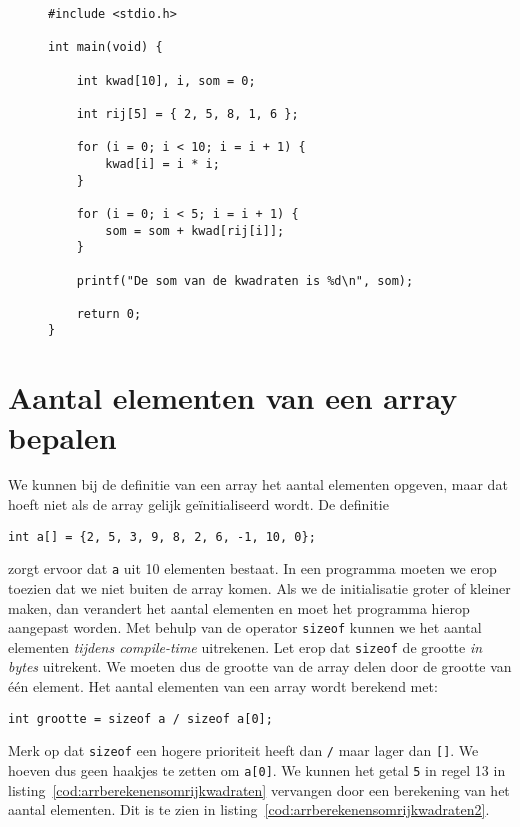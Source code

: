 \begin{figure}[!ht]
\begin{lstlisting}[caption=Afdrukken van de som van twee  kwadraten.,label=cod:arrberekenensomrijkwadraten]
#include <stdio.h>

int main(void) {
 
    int kwad[10], i, som = 0;

    int rij[5] = { 2, 5, 8, 1, 6 };

    for (i = 0; i < 10; i = i + 1) {
        kwad[i] = i * i;
    }

    for (i = 0; i < 5; i = i + 1) {
        som = som + kwad[rij[i]];
    }

    printf("De som van de kwadraten is %d\n", som);

    return 0;
}
\end{lstlisting}
\end{figure}


\section{Aantal elementen van een array bepalen}
We kunnen bij de definitie van een array het aantal elementen opgeven, maar dat hoeft niet als de array gelijk geïnitialiseerd wordt. De definitie

\begin{lstlisting}[style=lstoneline]
int a[] = {2, 5, 3, 9, 8, 2, 6, -1, 10, 0};
\end{lstlisting}

zorgt ervoor dat \texttt{a} uit 10 elementen bestaat. In een programma moeten we erop toezien dat we niet buiten de array komen. Als we de initialisatie groter of kleiner maken, dan verandert het aantal elementen en moet het programma hierop aangepast worden. Met behulp van de operator \texttt{sizeof} kunnen we het aantal elementen \textsl{tijdens compile-time} uitrekenen. Let erop dat \texttt{sizeof} de grootte \textsl{in bytes} uitrekent. We moeten dus de grootte van de array delen door de grootte van één element. Het aantal elementen van een array wordt berekend met:

\begin{lstlisting}[style=lstoneline]
int grootte = sizeof a / sizeof a[0];
\end{lstlisting}

Merk op dat \texttt{sizeof} een hogere prioriteit heeft dan \texttt{/} maar lager dan \texttt{[]}. We hoeven dus geen haakjes te zetten om \texttt{a[0]}. We kunnen het getal \texttt{5} in regel 13 in listing~\ref{cod:arrberekenensomrijkwadraten} vervangen door een berekening van het aantal elementen. Dit is te zien in listing~\ref{cod:arrberekenensomrijkwadraten2}.

